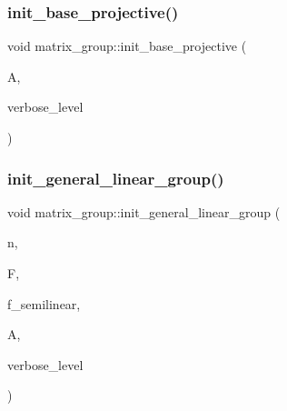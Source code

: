 \mbox{\label{classmatrix__group_a49cfcd22180b66ca629a9d55a82cd126}} 
\subsubsection{\texorpdfstring{init\+\_\+base\+\_\+projective()}{init\_base\_projective()}}
{\footnotesize\ttfamily void matrix\+\_\+group\+::init\+\_\+base\+\_\+projective (\begin{DoxyParamCaption}\item[{\mbox{\hyperlink{classaction}{action}} $\ast$}]{A,  }\item[{\mbox{\hyperlink{galois_8h_a09fddde158a3a20bd2dcadb609de11dc}{I\+NT}}}]{verbose\+\_\+level }\end{DoxyParamCaption})}

\mbox{\label{classmatrix__group_a0aa3c4187d8504b88f9f0aa644b48b86}} 
\subsubsection{\texorpdfstring{init\+\_\+general\+\_\+linear\+\_\+group()}{init\_general\_linear\_group()}}
{\footnotesize\ttfamily void matrix\+\_\+group\+::init\+\_\+general\+\_\+linear\+\_\+group (\begin{DoxyParamCaption}\item[{\mbox{\hyperlink{galois_8h_a09fddde158a3a20bd2dcadb609de11dc}{I\+NT}}}]{n,  }\item[{\mbox{\hyperlink{classfinite__field}{finite\+\_\+field}} $\ast$}]{F,  }\item[{\mbox{\hyperlink{galois_8h_a09fddde158a3a20bd2dcadb609de11dc}{I\+NT}}}]{f\+\_\+semilinear,  }\item[{\mbox{\hyperlink{classaction}{action}} $\ast$}]{A,  }\item[{\mbox{\hyperlink{galois_8h_a09fddde158a3a20bd2dcadb609de11dc}{I\+NT}}}]{verbose\+\_\+level }\end{DoxyParamCaption})}

